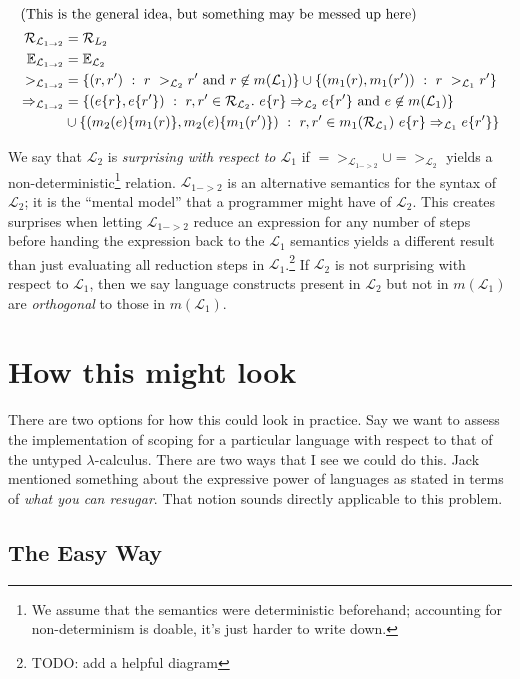 \documentclass[12pt]{article}
\newcommand{\R}{\mathcal{R}}
\newcommand{\E}{\mathbb{E}}
\renewcommand{\L}{\mathcal{L}}
\begin{document}
\begin{align*}
\intertext{(This is the general idea, but something may be messed up here)}
  \R_{\L_{1 -> 2}} &= \R_{L_2} \\
  \E_{\L_{1 -> 2}} &= \E_{\L_2}  \\
  ~>_{\L_{1 -> 2}} &= \{(r, r')~:~r ~>_{\L_2}r' \text{ and } r \not\in m(\L_1)\} \cup 
  \{(m_1(r), m_1(r'))~:~r~>_{\L_1}r'\}\\
  =>_{\L_{1 -> 2}} &= \{(e\{r\}, e\{r'\})~:~r,r' \in \R_{\L_2}.~e\{r\} =>_{\L_2}e\{r'\} \text{ and } e \not\in m(\L_1)\}\\ 
  & \cup 
  \{(m_2(e)\{m_1(r)\}, m_2(e)\{m_1(r')\})~:~r,r' \in m_1(\R_{\L_1})~e\{r\}=>_{\L_1}e\{r'\}\}
\end{align*}

We say that $\L_2$ is \emph{surprising with respect to $\L_1$} if $=>_{\L_{1 ->
    2}} \cup =>_{\L_2}$ yields a non-deterministic\footnote{We assume that the
  semantics were deterministic beforehand; accounting for non-determinism is
  doable, it's just harder to write down.} relation. $\L_{1->2}$ is an alternative
semantics for the syntax of $\L_2$; it is the ``mental model'' that a programmer
might have of $\L_2$. This creates surprises when letting $\L_{1->2}$ reduce an
expression for any number of steps before handing the expression back to the
$\L_1$ semantics yields a different result than just evaluating all reduction
steps in $\L_1$.\footnote{TODO: add a helpful diagram} If $\L_2$ is not
surprising with respect to $\L_1$, then we say language constructs present in
$\L_2$ but not in $m(\L_1)$ are \textit{orthogonal} to those in $m(\L_1)$.

\section{How this might look}

There are two options for how this could look in practice. Say we want to assess
the implementation of scoping for a particular language with respect to that of
the untyped $\lambda$-calculus. There are two ways that I see we could do this.
Jack mentioned something about the expressive power of languages as stated in
terms of \emph{what you can resugar}. That notion sounds directly applicable to
this problem.

\subsection{The Easy Way}
\end{document}
